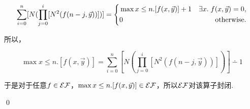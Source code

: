 \begin{pf} \rm 

$$
\sum_{i=0}^{n}[N(\prod_{j=0}^i[N^2(f(n-j,\vec{y}))])]
=\left\{
\begin{aligned}
    &\max x\le n.[f(x,\vec{y})]+1 & \exists x.\;f(x,\vec{y})=0, \\
    &0 & \mathrm{otherwise.} \\
\end{aligned}
\right.
$$

所以，

$$
\max x\le n.[f(x,\vec{y})] = \sum_{i=0}^{n}[N(\prod_{j=0}^i[N^2(f(n-j,\vec{y}))])] \dotminus 1
$$

于是对于任意$f\in\mathcal{EF}$，$\max x\le n.[f(x,\vec{y})]\in\mathcal{EF}$，所以$\mathcal{EF}$对该算子封闭.

    \qed
\end{pf}
